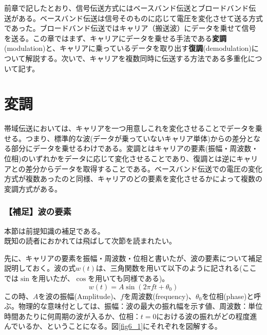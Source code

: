 前章で記したとおり、信号伝送方式にはベースバンド伝送とブロードバンド伝送がある。ベースバンド伝送は信号そのものに応じて電圧を変化させて送る方式であった。ブロードバンド伝送ではキャリア（搬送波）にデータを乗せて信号を送る。この章ではまず、キャリアにデータを乗せる手法である\textbf{変調}(modulation)と、キャリアに乗っているデータを取り出す\textbf{復調}(demodulation)について解説する。次いで、キャリアを複数同時に伝送する方法である多重化について記す。

\section{変調}

帯域伝送においては、キャリアを一つ用意しこれを変化させることでデータを乗せる。つまり、標準的な波(データが乗っていないキャリア単体)からの差分となる部分にデータを乗せるわけである。変調とはキャリアの要素(振幅・周波数・位相)のいずれかをデータに応じて変化させることであり、復調とは逆にキャリアとの差分からデータを取得することである。ベースバンド伝送での電圧の変化方式が複数あったのと同様、キャリアのどの要素を変化させるかによって複数の変調方式がある。

\subsubsection{【補足】波の要素}

\begin{center}
\begin{minipage}[]{0.75\linewidth}
\begin{screen}
\begin{center}
本節は前提知識の補足である。\\
既知の読者におかれては飛ばして次節を読まれたい。
\end{center}
\end{screen}
\end{minipage}
\end{center}

先に、キャリアの要素を振幅・周波数・位相と書いたが、波の要素について補足説明しておく。波の式$w(t)$は、三角関数を用いて以下のように記される(ここでは$\sin$を用いたが、$\cos$を用いても同様である)。
\begin{equation}
w(t)=A\sin (2\pi ft+\theta_0)
\end{equation}
この時、$A$を波の振幅(Amplitude)、$f$を周波数(frequency)、$\theta_0$を位相(phase)と呼ぶ。物理的な意味付としては、振幅：波の最大の振れ幅を示す値、周波数：単位時間あたりに何周期の波が入るか、位相：$t=0$における波の振れがどの程度進んでいるか、ということになる。図\ref{fig6_1}にそれぞれを図解する。

